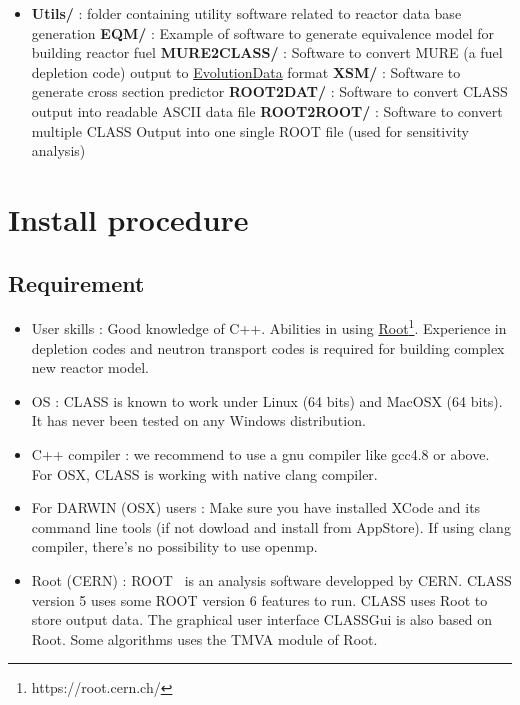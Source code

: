 \begin{itemize}
\item \textbf{Utils/} : folder containing utility software related to reactor data base generation
\subitem \textbf{EQM/} : Example of software to generate equivalence model for building reactor fuel
\subitem \textbf{MURE2CLASS/} : Software to convert MURE (a fuel depletion code)  output to \hyperref[sec:EvolutionData]{EvolutionData} format
\subitem \textbf{XSM/} : Software to generate cross section predictor
\subitem \textbf{ROOT2DAT/} : Software to convert CLASS output into readable ASCII data file
\subitem \textbf{ROOT2ROOT/} : Software to convert multiple CLASS Output into one single ROOT file (used for sensitivity analysis)
 
\end{itemize}

\chapter{Install procedure}

\section{Requirement}

\begin{itemize}
\item User skills : Good knowledge of C++. Abilities in using \href{https://root.cern.ch/}{Root}\footnote{https://root.cern.ch/}.
Experience in depletion codes and neutron transport codes is required for building complex new reactor model.
\item OS : CLASS is known to work under Linux (64  bits) and MacOSX (64 bits). It  has never been tested on any Windows distribution.
\item C++ compiler :  we recommend to use a gnu compiler like gcc4.8 or above. For OSX, CLASS is working with native clang compiler.
\item For DARWIN (OSX) users : 
Make sure you have installed XCode and its command line tools (if not dowload and install from AppStore). If using clang compiler, there's no possibility to use openmp. 
\item Root (CERN) :  
ROOT~\cite{Brun_1997} is an analysis software developped by CERN. CLASS version 5 uses some ROOT version 6 features to run. CLASS uses Root to store output data. The graphical user interface CLASSGui is also based on Root. Some algorithms uses the TMVA module of Root. 
\end{itemize}

